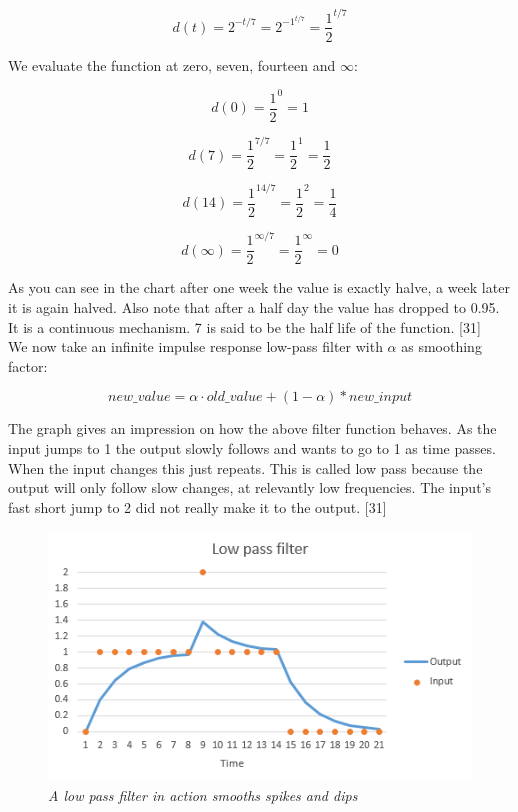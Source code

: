 \begin{equation}
d(t) =  2^{-t/7} =  2^{-1^{t/7}} = \frac{1}{2}^{t/7}
\end{equation}

We evaluate the function at zero, seven, fourteen and $\infty$:

\begin{equation}
d(0) = \frac{1}{2}^{0} = 1
\end{equation}

\begin{equation}
d(7) = \frac{1}{2}^{7/7} = \frac{1}{2}^{1} = \frac{1}{2} 
\end{equation}

\begin{equation}
d(14) = \frac{1}{2}^{14/7} = \frac{1}{2}^{2} = \frac{1}{4} 
\end{equation}

\begin{equation}
d(\infty) = \frac{1}{2}^{\infty/7} = \frac{1}{2}^{\infty} = 0 
\end{equation}


As you can see in the chart after one week the value is exactly halve, a week later it is again halved. Also note that after a half day the value has dropped to 0.95. It is a continuous mechanism. 7 is said to be the half life of the function. [31]\\

We now take an infinite impulse response low-pass filter with $\alpha$ as smoothing factor:

\begin{equation}
new\_value = \alpha \cdot old\_value + (1-\alpha) * new\_input
\end{equation}

The graph gives an impression on how the above filter function behaves. As the input jumps to 1 the output slowly follows and wants to go to 1 as time passes. When the input changes this just repeats. This is called low pass because the output will only follow slow changes, at relevantly low frequencies. The input’s fast short jump to 2 did not really make it to the output. [31]\\

\begin{figure}
\centering
\includegraphics{figures/low-pass}
\caption{\textit{A low pass filter in action smooths spikes and dips}}
\small
\end{figure}


